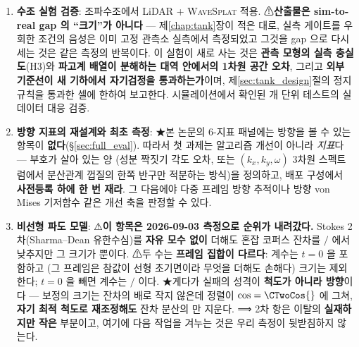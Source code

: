 \documentclass[11pt]{report}
\numberwithin{equation}{chapter}
\numberwithin{figure}{chapter}
\numberwithin{table}{chapter}
\newcommand{\WS}{\textsc{WaveSplat}}
\begin{document}
\begin{enumerate}
  \item \textbf{수조 실험 검증}: 조파수조에서 LiDAR + \WS{} 적용.
        ⚠\textbf{산출물은 sim-to-real gap 의 ``크기''가 아니다} --- 제\ref{chap:tank}장이
        적은 대로, 실측 게이트를 우회한 조건의 음성은 이미 고정 관측소 실측에서 측정되었고
        그것을 gap 으로 다시 세는 것은 같은 측정의 반복이다. 이 실험이 새로 사는 것은
        \textbf{관측 모형의 실측 충실도}(H3)와 \textbf{파고계 배열이 분해하는 대역 안에서의
        1차원 공간 오차}, 그리고 \textbf{외부 기준선이 새 기하에서 자기검정을 통과하는가}이며,
        제\ref{sec:tank_design}절의 정지규칙을 통과한 셀에 한하여 보고한다.
        시뮬레이션에서 확인된 \DeployNumTests 개 단위 테스트의 실데이터 대응 검증.

  \item \textbf{방향 지표의 재설계와 최초 측정}: ★본 논문의 6-지표 패널에는
        방향을 볼 수 있는 항목이 \textbf{없다}(\S\ref{sec:full_eval}).
        따라서 첫 과제는 알고리즘 개선이 아니라 \emph{지표}다 --- 부호가 살아 있는 양
        (성분 짝짓기 각도 오차, 또는 $(k_x,k_y,\omega)$ 3차원 스펙트럼에서
        분산관계 껍질의 한쪽 반구만 적분하는 방식)을 정의하고, 배포 구성에서
        \textbf{사전등록 하에 한 번 재라}. 그 다음에야 다중 프레임 방향 추적이나
        방향 von Mises 기저함수 같은 개선 축을 판정할 수 있다.

  \item \textbf{비선형 파도 모델}: ⚠\textbf{이 항목은 2026-09-03 측정으로 순위가
        내려갔다.} Stokes 2차(Sharma--Dean 유한수심)를 \textbf{자유 모수 없이} 더해도
        혼잡 코퍼스 잔차를 \CTwoWin{}$/$\CTwoN{} 에서 낮추지만 그 크기가 \CTwoRel{}
        뿐이다. ⚠두 수는 \textbf{프레임 집합이 다르다}: 계수는 $t{=}0$ 을 포함하고
        (그 프레임은 참값이 선형 초기면이라 무엇을 더해도 손해다) 크기는 제외한다;
        $t{=}0$ 을 빼면 계수는 \CTwoWinNoZero{}$/$\CTwoN{} 이다.
        ★게다가 실패의 성격이 \textbf{척도가 아니라 방향}이다 --- 보정의 크기는 잔차의
        \CTwoCOverR{} 배로 작지 않은데 정렬이 $\cos = \CTwoCos{}$ 에 그쳐,
        \textbf{자기 최적 척도로 재조정해도} 잔차 분산의 \CTwoOptPct{} 만 지운다. ⟹ 2차 항은 이탈의 \textbf{실재하지만
        작은} 부분이고, 여기에 다음 작업을 겨누는 것은 우리 측정이 뒷받침하지 않는다.


\end{enumerate}
\end{document}
